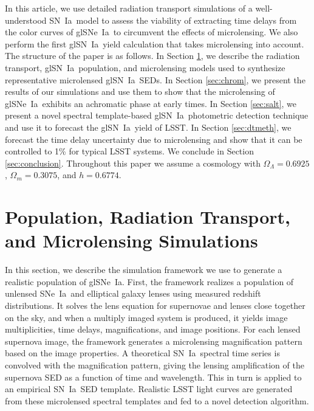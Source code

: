 \documentclass[iop,apj,numberedappendix,twocolappendix]{emulateapj}
\newcommand{\snia}{{\rm SN~Ia}}
\newcommand{\sneia}{{\rm SNe~Ia}}
\begin{document}
In this article, we use detailed radiation transport simulations of a well-understood \snia\ model to assess the viability of extracting time delays from the color curves of gl\sneia\ to circumvent the effects of microlensing.
We also perform the first gl\snia\ yield calculation that takes microlensing into account.
The structure of the paper is as follows.
In Section \ref{sec:sim}, we describe the radiation transport, gl\snia\ population, and microlensing models used to synthesize representative microlensed  gl\snia\ SEDs.
In Section \ref{sec:chrom}, we present the results of our simulations and use them to show that the microlensing of gl\sneia\ exhibits an achromatic phase at early times.
In Section \ref{sec:salt}, we present a novel spectral template-based gl\snia\ photometric detection technique and use it to forecast the gl\snia\ yield of LSST.
In Section \ref{sec:dtmeth}, we forecast the time delay uncertainty due to microlensing and show that it can be controlled to 1\% for typical LSST systems. 
We conclude in Section \ref{sec:conclusion}.
Throughout this paper we assume a \cite{planck15} cosmology with $\Omega_\Lambda=0.6925$, $\Omega_m=0.3075$, and $h=0.6774$.

\section{Population, Radiation Transport, and Microlensing Simulations}
\label{sec:sim}
In this section, we describe the simulation framework we use to generate a realistic population of gl\sneia.
First, the framework realizes a population of unlensed \sneia\ and elliptical galaxy lenses using measured redshift distributions. 
It solves the lens equation for supernovae and lenses close together on the sky, and when a multiply imaged system is produced, it yields image multiplicities, time delays, magnifications, and image positions.
For each lensed supernova image, the framework generates a microlensing magnification pattern based on the image properties. 
A theoretical \snia\ spectral time series is convolved with the magnification pattern, giving the lensing amplification of the supernova SED as a function of time and wavelength. 
This in turn is applied to an empirical \snia\ SED template.  
Realistic LSST light curves are generated from these microlensed spectral templates and fed to a novel detection algorithm.
\end{document}
